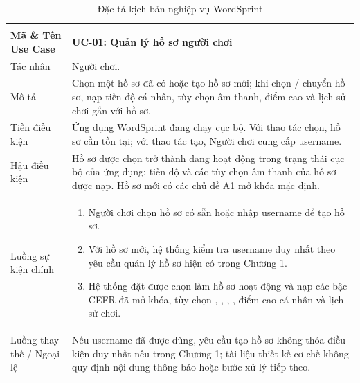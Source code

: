 \begin{xltabular}{\textwidth}{|L{3.3cm}|Y|}
\caption{Đặc tả kịch bản nghiệp vụ WordSprint}
\label{tab:business_use_case_specs}
\\
\hline
{} &  \\
\hline
\endfirsthead
\hline
{} &  \\
\hline
\endhead

\textbf{Mã \& Tên Use Case} & \textbf{UC-01: Quản lý hồ sơ người chơi} \\ \hline
Tác nhân & Người chơi. \\ \hline
Mô tả & Chọn một hồ sơ đã có hoặc tạo hồ sơ mới; khi chọn / chuyển hồ sơ, nạp tiến độ cá nhân, tùy chọn âm thanh, điểm cao và lịch sử chơi gắn với hồ sơ. \\ \hline
Tiền điều kiện & Ứng dụng WordSprint đang chạy cục bộ. Với thao tác chọn, hồ sơ cần tồn tại; với thao tác tạo, Người chơi cung cấp username. \\ \hline
Hậu điều kiện & Hồ sơ được chọn trở thành  đang hoạt động trong trạng thái cục bộ của ứng dụng; tiến độ và các tùy chọn âm thanh của hồ sơ được nạp. Hồ sơ mới có các chủ đề A1 mở khóa mặc định. \\ \hline
Luồng sự kiện chính &
\begin{enumerate}[nosep,leftmargin=*]
    \item Người chơi chọn hồ sơ có sẵn hoặc nhập username để tạo hồ sơ.
    \item Với hồ sơ mới, hệ thống kiểm tra username duy nhất theo yêu cầu quản lý hồ sơ hiện có trong Chương 1.
    \item Hệ thống đặt  được chọn làm hồ sơ hoạt động và nạp các bậc CEFR đã mở khóa, tùy chọn , , , , điểm cao cá nhân và lịch sử chơi.
\end{enumerate} \\ \hline
Luồng thay thế / Ngoại lệ & Nếu username đã được dùng, yêu cầu tạo hồ sơ không thỏa điều kiện duy nhất nêu trong Chương 1; tài liệu thiết kế cơ chế không quy định nội dung thông báo hoặc bước xử lý tiếp theo. \\ \hline


\end{xltabular}
